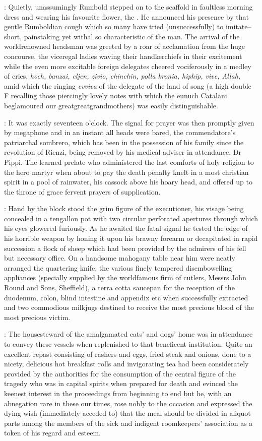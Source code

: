 :
Quietly, unassumingly Rumbold stepped on to the scaffold in faultless
morning dress and wearing his favourite flower,
the .
He announced his presence by that gentle Rumboldian cough which so
many have tried (unsuccessfully) to imitate--short, painstaking yet withal
so characteristic of the man. The arrival of the worldrenowned headsman
was greeted by a roar of acclamation from the huge concourse, the
viceregal ladies waving their handkerchiefs in their excitement while the
even more excitable foreign delegates cheered vociferously in a medley of
cries, \emph{hoch, banzai, eljen, zivio, chinchin, polla kronia, hiphip, vive,
Allah,} amid which the ringing \emph{evviva} of the delegate of the land of song
(a high double F recalling those piercingly lovely notes with which the
eunuch Catalani beglamoured our greatgreatgrandmothers) was easily
distinguishable.

:
It was exactly seventeen o'clock. The signal for prayer
was then promptly given by megaphone and in an instant all heads were
bared, the commendatore's patriarchal sombrero, which has been in the
possession of his family since the revolution of Rienzi, being removed by
his medical adviser in attendance, Dr Pippi. The learned prelate who
administered the last comforts of holy religion to the hero martyr when
about to pay the death penalty knelt in a most christian spirit in a pool
of rainwater, his cassock above his hoary head, and offered up to the
throne of grace fervent prayers of supplication.

:
Hand by the block stood
the grim figure of the executioner, his visage being concealed in a
tengallon pot with two circular perforated apertures through which
his eyes glowered furiously. As he awaited the fatal signal he
tested the edge of his horrible weapon by honing it upon his
brawny forearm or decapitated in rapid succession a flock of
sheep which had been provided by the admirers of his fell but necessary
office. On a handsome mahogany table near him were neatly arranged the
quartering knife, the various finely tempered disembowelling appliances
(specially supplied by the worldfamous firm of cutlers, Messrs John Round
and Sons, Sheffield), a terra cotta saucepan for the reception of the
duodenum, colon, blind intestine and appendix etc when successfully
extracted and two commodious milkjugs destined to receive the most
precious blood of the most precious victim.

:
The housesteward of the
amalgamated cats' and dogs' home was in attendance to convey these
vessels when replenished to that beneficent institution. Quite an
excellent repast consisting of rashers and eggs, fried steak and onions,
done to a nicety, delicious hot breakfast rolls and invigorating tea had
been considerately provided by the authorities for the consumption
of the central figure of the tragedy who was in capital spirits
when prepared for death and evinced the keenest interest in the
proceedings from beginning to end but he, with an abnegation rare
in these our times, rose nobly to the occasion and expressed the
dying wish (immediately acceded to) that the meal should be
divided in aliquot parts among the members of the sick and indigent
roomkeepers' association as a token of his regard and esteem.

